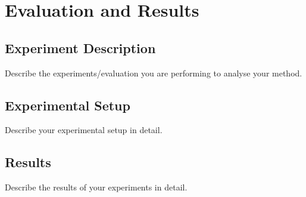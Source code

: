 \documentclass[../thesis.tex]{subfiles}
\begin{document}
    \chapter{Evaluation and Results}

    \section{Experiment Description}

    Describe the experiments/evaluation you are performing to analyse your method.

    \section{Experimental Setup}

    Describe your experimental setup in detail.

    \section{Results}

    Describe the results of your experiments in detail.
\end{document}

